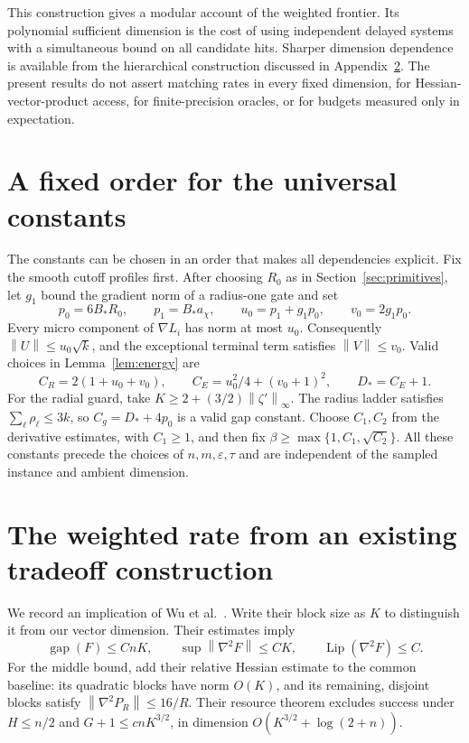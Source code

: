 \documentclass[11pt]{article}
\theoremstyle{definition}
\theoremstyle{remark}
\newcommand{\eps}{\varepsilon}
\newcommand{\norm}[1]{\left\|#1\right\|}
\newcommand{\Lip}{\operatorname{Lip}}
\begin{document}
This construction gives a modular account of the weighted frontier.
Its polynomial sufficient dimension is the cost of using independent
delayed systems with a simultaneous bound on all candidate hits.
Sharper dimension dependence is available from the hierarchical
construction discussed in Appendix~\ref{app:comparison}.
The present results do not assert matching rates in every fixed
dimension, for Hessian-vector-product access, for finite-precision
oracles, or for budgets measured only in expectation.

\appendix
\section{A fixed order for the universal constants}\label{app:constants}
The constants can be chosen in an order that makes all dependencies
explicit. Fix the smooth cutoff profiles first. After choosing $R_0$
as in Section~\ref{sec:primitives}, let $g_1$ bound the gradient norm of
a radius-one gate and set
\[
 p_0=6B_*R_0,\qquad p_1=B_*a_\chi,\qquad
 u_0=p_1+g_1p_0,\qquad v_0=2g_1p_0.
\]
Every micro component of $\nabla L_i$ has norm at most $u_0$.
Consequently $\norm{U}\le u_0\sqrt{k}$, and the exceptional terminal
term satisfies $\norm{V}\le v_0$. Valid choices in
Lemma~\ref{lem:energy} are
\[
 C_R=2(1+u_0+v_0),\qquad
 C_E=u_0^2/4+(v_0+1)^2,\qquad
 D_*=C_E+1.
\]
For the radial guard, take
$K\ge2+(3/2)\norm{\zeta'}_\infty$.
The radius ladder satisfies $\sum_\ell\rho_\ell\le3k$, so
$C_g=D_*+4p_0$ is a valid gap constant.
Choose $C_1,C_2$ from the derivative estimates, with $C_1\ge1$,
and then fix $\beta\ge\max\{1,C_1,\sqrt{C_2}\}$.
All these constants precede the choices of $n,m,\eps,\tau$ and are
independent of the sampled instance and ambient dimension.

\section{The weighted rate from an existing tradeoff construction}
\label{app:comparison}
We record an implication of Wu et al.\ \cite[Lemma 10.1, Theorems 11.2
and 14.1]{wu}. Write their block size as $K$ to distinguish it from our
vector dimension. Their estimates imply
\begin{equation}\label{eq:prior-scales}
 \operatorname{gap}(F)\le CnK,\qquad
 \sup\norm{\nabla^2F}\le CK,\qquad
 \Lip(\nabla^2F)\le C.
\end{equation}
For the middle bound, add their relative Hessian estimate to the common
baseline: its quadratic blocks have norm $O(K)$, and its remaining,
disjoint blocks satisfy $\norm{\nabla^2P_R}\le16/R$.
Their resource theorem excludes success under
$H\le n/2$ and $G+1\le cnK^{3/2}$, in dimension
$O(K^{3/2}+\log(2+n))$.
\end{document}
